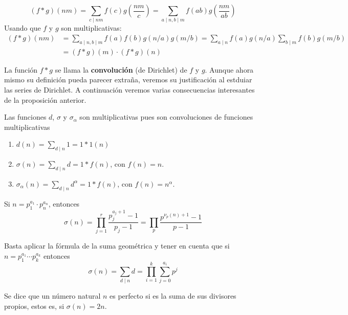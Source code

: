 \documentclass[TAN.tex]{subfiles}
\begin{document}
\begin{dem}
\[ (f*g)(nm) = \sum_{c\mid nm}f(c)g\left(\frac{nm}{c}\right) = \sum_{a\mid n,b\mid m}f(ab)g\left(\frac{nm}{ab}\right) \]
Usando que $f$ y $g$ son multiplicativas:
\begin{align*}
	(f*g)(nm) & = \sum_{a\mid n,b\mid m} f(a)f(b)g(n/a)g(m/b)  = \sum_{a\mid n}f(a)g(n/a) \sum_{b\mid m}f(b)g(m/b) \\
	& = (f*g)(m) \cdot (f*g)(n)
\end{align*}
\QED
\end{dem}

La función $f * g$ se llama la \textbf{convolución} (de Dirichlet) de $f$ y $g$.
Aunque ahora mismo su definición pueda parecer extraña, veremos su justificación al estduiar las series de Dirichlet.
A continuación veremos varias consecuencias interesantes de la proposición anterior.

\begin{ejs}
Las funciones $d$, $σ$ y $σ_α$ son multiplicativas pues son convoluciones de funciones multiplicativas
\begin{enumerate}
\item $d(n) =\sum_{d\mid n} 1 = 1 \ast 1 (n)$
\item $\sigma(n)= \sum_{d\mid n} d = 1 \ast f (n)$, con $f(n)=n$.
\item $\sigma_\alpha (n) = \sum_{d\mid n} d^\alpha = 1 \ast f (n)$, con $f(n)=n^\alpha$.
\end{enumerate}
\end{ejs}

\begin{prop}
Si $n = p_1^{a_1} \cdot p_n^{a_n}$, entonces
\[ σ(n) = \prod_{j=1}^r \frac{p_j^{a_j+1}-1}{p_j-1} = \prod_p \frac{p^{ν_p(n)+1}-1}{p-1} \]
\end{prop}
\begin{dem}
Basta aplicar la fórmula de la suma geométrica y tener en cuenta que si $n=p_1^{a_1}\cdots p_k^{a_k}$ entonces
$$\sigma(n) = \sum_{d\mid n} d = \prod_{i=1}^k \sum_{j=0}^{a_i} p^j$$
\end{dem}
\begin{defi}
Se dice que un número natural $n$ es perfecto si es la suma de sus divisores propios, estos es, si $σ(n)=2n$.
\end{defi}
\end{document}
